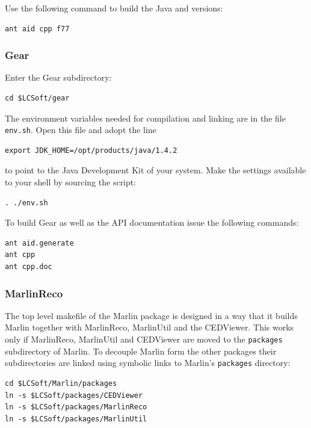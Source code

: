 Use the following command to build the Java and \CPP{} versions:

\begin{verbatim}
ant aid cpp f77 
\end{verbatim}

\subsubsection*{Gear}

Enter the Gear subdirectory:

\begin{verbatim}
cd $LCSoft/gear
\end{verbatim}

The environment variables needed for compilation and linking are in the file 
{\tt env.sh}. Open this file and adopt the line 

\begin{verbatim}
export JDK_HOME=/opt/products/java/1.4.2
\end{verbatim}

to point to the Java Development Kit of your system.
Make the settings available to your shell by sourcing the script:

\begin{verbatim}
. ./env.sh 
\end{verbatim}

To build Gear as well as the API documentation
issue the following commands:

\begin{verbatim}
ant aid.generate 
ant cpp 
ant cpp.doc 
\end{verbatim}

\subsubsection*{MarlinReco}

The top level makefile of the Marlin package is designed in a way that it
builds Marlin together with MarlinReco, MarlinUtil and the CEDViewer. 
This works only if MarlinReco, MarlinUtil and CEDViewer are moved to the 
{\tt packages} subdirectory of Marlin. To decouple Marlin form the
other packages their subdirectories are linked using symbolic links to  
Marlin's {\tt packages} directory:

\begin{verbatim} 
cd $LCSoft/Marlin/packages
ln -s $LCSoft/packages/CEDViewer
ln -s $LCSoft/packages/MarlinReco
ln -s $LCSoft/packages/MarlinUtil
\end{verbatim}

